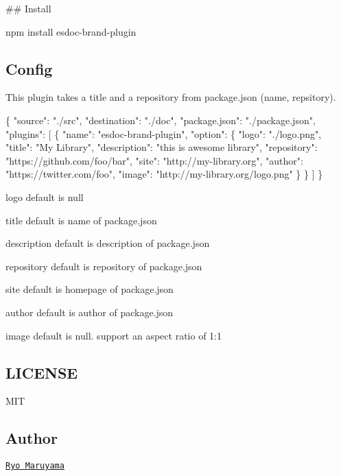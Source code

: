 \#\# Install 
\begin{DoxyCode}
npm install esdoc-brand-plugin
\end{DoxyCode}


\subsection*{Config}

This plugin takes a title and a repository from {\ttfamily package.\+json (name, repsitory)}. 
\begin{DoxyCode}
\{
  "source": "./src",
  "destination": "./doc",
  "package.json": "./package.json",
  "plugins": [
    \{
      "name": "esdoc-brand-plugin",
      "option": \{
        "logo": "./logo.png",
        "title": "My Library",
        "description": "this is awesome library",
        "repository": "https://github.com/foo/bar",
        "site": "http://my-library.org",
        "author": "https://twitter.com/foo",
        "image": "http://my-library.org/logo.png"
      \}
    \}
  ]
\}
\end{DoxyCode}



\begin{DoxyItemize}
\item {\ttfamily logo} default is {\ttfamily null}
\item {\ttfamily title} default is {\ttfamily name} of {\ttfamily package.\+json}
\item {\ttfamily description} default is {\ttfamily description} of {\ttfamily package.\+json}
\item {\ttfamily repository} default is {\ttfamily repository} of {\ttfamily package.\+json}
\item {\ttfamily site} default is {\ttfamily homepage} of {\ttfamily package.\+json}
\item {\ttfamily author} default is {\ttfamily author} of {\ttfamily package.\+json}
\item {\ttfamily image} default is {\ttfamily null}. support an aspect ratio of 1\+:1
\end{DoxyItemize}

\subsection*{L\+I\+C\+E\+N\+SE}

M\+IT

\subsection*{Author}

\href{https://github.com/h13i32maru}{\tt Ryo Maruyama} 